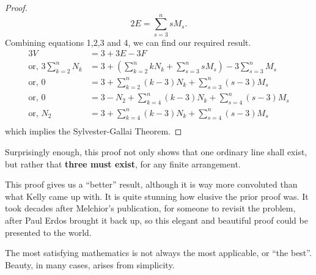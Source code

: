\documentclass{article}
\begin{document}
\begin{proof}
\begin{equation}
        2E = \sum_{s=3}^n sM_s.
    \end{equation}
    Combining equations 1,2,3 and 4, we can find our required result.
    \begin{align*}
        3V &= 3 + 3E - 3F \\
        \text{or,  }3\sum_{k=2}^{n} N_{k} &= 3 + (\sum_{k=2}^{n} kN_k + \sum_{s=3}^n sM_s) - 3\sum_{s=3}^n M_s \\
        \text{or,  } 0 &= 3 + \sum_{k=2}^{n} (k-3)N_k + \sum_{s=3}^n (s-3)M_s\\ 
        \text{or,  } 0 &= 3 - N_2 + \sum_{k=4}^{n} (k-3)N_k + \sum_{s=4}^n (s-3)M_s\\ 
        \text{or,  } N_2 &= 3 + \sum_{k=4}^{n} (k-3)N_k + \sum_{s=4}^n (s-3)M_s\\ 
    \end{align*}
    which implies the Sylvester-Gallai Theorem.
\end{proof}

\noindent Surprisingly enough, this proof not only shows that one ordinary line shall exist, but rather that \textbf{three must exist}, for any finite arrangement.

\noindent This proof gives us a \enquote{better} result, although it is way more convoluted than what Kelly came up with. It is quite stunning how elusive the prior proof was. It took decades after Melchior's publication, for someone to revisit the problem, after Paul Erdos brought it back up, so this elegant and beautiful proof could be presented to the world.\newline

\noindent The most satisfying mathematics is not always the most applicable, or \enquote{the best}. Beauty, in many cases, arises from simplicity. 
\end{document}
